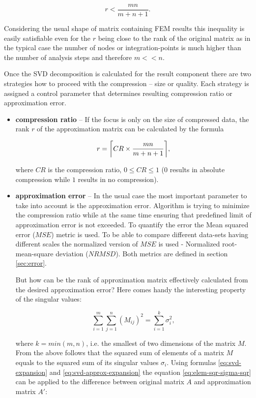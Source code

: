 $$r<\frac{m n}{m+n+1}.$$

Considering the usual shape of matrix containing FEM results this inequality is easily satisfiable even for the $r$ being close to the rank of the original matrix as in the typical case the number of nodes or integration-points is much higher than the number of analysis steps and therefore $m<<n$.

Once the SVD decomposition is calculated for the result component there are two strategies how to proceed with the compression -- size or quality. Each strategy is assigned a control parameter that determines resulting compression ratio or approximation error.


\begin{itemize}
\item \textbf{compression ratio} -- If the focus is only on the size of compressed data, the rank $r$ of the approximation matrix can be calculated by the formula

\begin{equation}
r=\ceil*{CR \times \frac{m n}{m+n+1}},
\end{equation}

where $CR$ is the compression ratio, $0 \leq CR \leq 1$ ($0$ results in absolute compression while $1$ results in no compression).

\item \textbf{approximation error} -- In the usual case the most important parameter to take into account is the approximation error. Algorithm is trying to minimize the compression ratio while at the same time ensuring that predefined limit of approximation error is not exceeded. To quantify the error the Mean squared error ($MSE$) metric is used. To be able to compare different data-sets having different scales the normalized version of $MSE$ is used - Normalized root-mean-square deviation ($NRMSD$). Both metrics are defined in section \ref{sec:error}.

But how can be the rank of approximation matrix effectively calculated from the desired approximation error? Here comes handy the interesting property of the singular values:

\begin{equation}
\sum_{i=1}^{m} \sum_{j=1}^{n} (M_{ij})^{2} = \sum_{i=1}^{k}{\sigma_{i}^{2}},
\label{eq:elem-sqr-sigma-sqr}
\end{equation}

where $k=min(m, n)$, i.e. the smallest of two dimensions of the matrix $M$. From the above follows that the squared sum of elements of a matrix $M$ equals to the squared sum of its singular values $\sigma_{i}$.  Using formulas \eqref{eq:svd-expansion} and \eqref{eq:svd-approx-expansion} the equation \eqref{eq:elem-sqr-sigma-sqr} can be applied to the difference between original matrix $A$ and approximation matrix $A'$:


\end{itemize}
